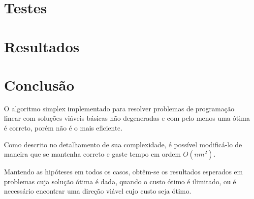 \documentclass[
	12pt,				%
	openright,			%
	oneside,			%
	a4paper,			%
	english,			%
	french,				%
	spanish,			%
	brazil,				%
	]{abntex2}
\begin{document}
\chapter{Testes}


\chapter{Resultados}



\chapter*[Conclusão]{Conclusão}
O algoritmo simplex implementado para resolver problemas de programação linear com 
soluções viáveis básicas não degeneradas e com pelo menos uma ótima é correto, porém 
não é o mais eficiente.

Como descrito no detalhamento de sua complexidade, é possível modificá-lo de maneira que 
se mantenha correto e gaste tempo em ordem $O(nm^2)$.

Mantendo as hipóteses em todos os casos, obtêm-se os resultados esperados em problemas cuja 
solução ótima é dada, quando o custo ótimo é ilimitado, ou é necessário encontrar uma 
direção viável cujo custo seja ótimo.
%
%
%
%
%
%
%
\end{document}
